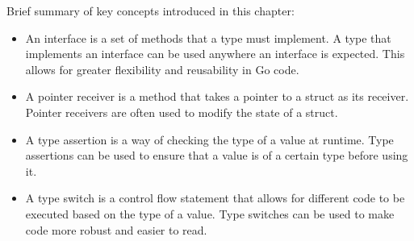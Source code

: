 Brief summary of key concepts introduced in this chapter:

\begin{itemize}

\item An interface is a set of methods that a type must implement. A type that
  implements an interface can be used anywhere an interface is expected. This
  allows for greater flexibility and reusability in Go code.

\item A pointer receiver is a method that takes a pointer to a struct as its receiver.
  Pointer receivers are often used to modify the state of a struct.

\item A type assertion is a way of checking the type of a value at runtime. Type
  assertions can be used to ensure that a value is of a certain type before
  using it.

\item A type switch is a control flow statement that allows for different code to be
  executed based on the type of a value. Type switches can be used to make code
  more robust and easier to read.

\end{itemize}

